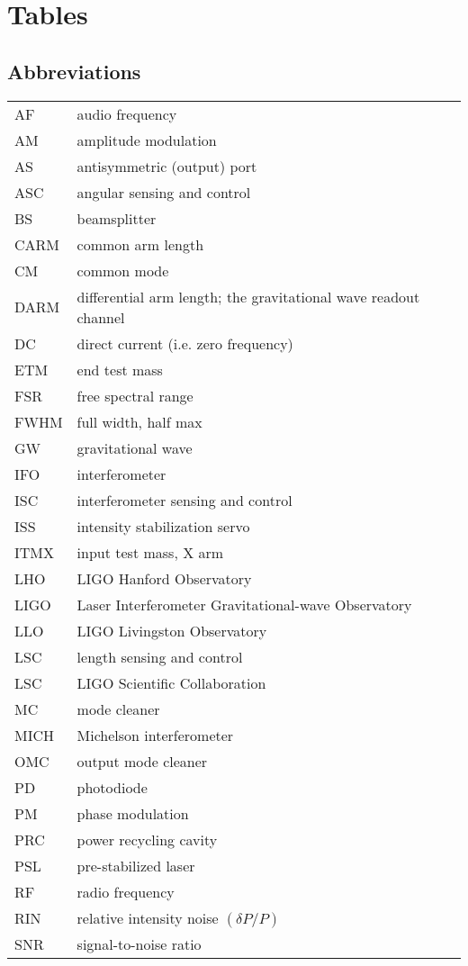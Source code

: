 \chapter{Tables}
\label{chapter6}
\section{Abbreviations}
\singlespacing
\begin{tabular}{|l|l|}
\hline 
AF   & audio frequency \\
AM   & amplitude modulation \\
AS   & antisymmetric (output) port \\
ASC  & angular sensing and control \\
BS   & beamsplitter \\
CARM & common arm length \\
CM   & common mode \\
DARM & differential arm length; the gravitational wave readout channel \\
DC   & direct current (i.e. zero frequency) \\
ETM  & end test mass \\
FSR  & free spectral range \\
FWHM & full width, half max \\
GW   & gravitational wave \\
IFO  & interferometer \\
ISC  & interferometer sensing and control \\
ISS  & intensity stabilization servo \\
ITMX & input test mass, X arm \\
LHO  & LIGO Hanford Observatory \\
LIGO & Laser Interferometer Gravitational-wave Observatory \\
LLO  & LIGO Livingston Observatory \\
LSC  & length sensing and control \\
LSC  & LIGO Scientific Collaboration \\
MC   & mode cleaner \\
MICH & Michelson interferometer \\
OMC  & output mode cleaner \\
PD   & photodiode \\
PM   & phase modulation \\
PRC  & power recycling cavity \\
PSL  & pre-stabilized laser \\
RF   & radio frequency \\
RIN  & relative intensity noise $(\delta P/P)$ \\
SNR  & signal-to-noise ratio \\
\hline
\end{tabular}

